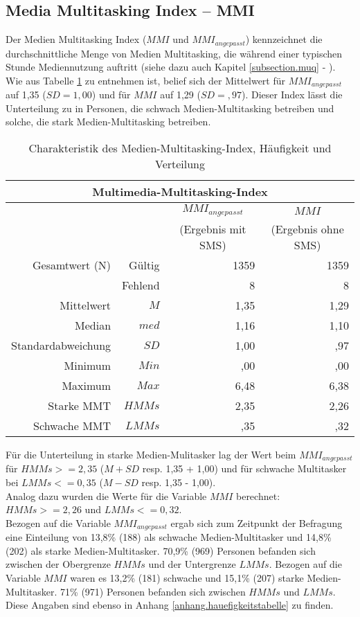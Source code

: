 \subsection{Media Multitasking Index -- MMI}
Der Medien Multitasking Index ($MMI$ und $MMI_{angepasst}$) kennzeichnet die durchschnittliche Menge von Medien Multitasking, die während einer typischen Stunde Mediennutzung auftritt (siehe dazu auch Kapitel \ref{subsection.muq} - ). Wie aus Tabelle \ref{table.deskrptMedien} zu entnehmen ist, belief sich der Mittelwert für $MMI_{angepasst}$ auf 1,35 ($SD =  1,00$) und für $MMI$ auf 1,29 ($SD = ,97$). Dieser Index lässt die Unterteilung zu in Personen, die schwach Medien-Multitasking betreiben und solche, die stark Medien-Multitasking betreiben.\\
\begin{table}[ht] 
    \centering
    \caption{Charakteristik des Medien-Multitasking-Index, Häufigkeit und Verteilung}
    \begin{tabular}[t]{|r r|r|r|} 
        \hline
        \multicolumn{4}{|c|}{\textbf{Multimedia-Multitasking-Index}}\\ 
        \hline       
        \multicolumn{2}{|c}{} & \multicolumn{1}{c|}{$MMI_{angepasst}$} & \multicolumn{1}{|c|}{$MMI$}\\
        \multicolumn{2}{|c}{} & \multicolumn{1}{c|}{(Ergebnis mit SMS)} & \multicolumn{1}{|c|}{(Ergebnis ohne SMS)}\\
        \hline
        Gesamtwert (N) & Gültig & 1359 & 1359\\
        & Fehlend & 8 & 8\\
        Mittelwert & $M$ & 1,35 & 1,29\\
        Median & $med$ & 1,16 & 1,10\\
        Standardabweichung & $SD$ & 1,00 & ,97\\
        Minimum & $Min$ & ,00 & ,00\\
        Maximum & $Max$ & 6,48 & 6,38\\
        Starke MMT & $HMMs$ & 2,35 & 2,26\\
        Schwache MMT & $LMMs$ & ,35 & ,32\\
        \hline
    \end{tabular}
    \label{table.deskrptMedien}
\end{table}
Für die Unterteilung in starke Medien-Mulitasker lag der Wert beim $MMI_{angepasst}$ für $HMMs >= 2,35$ ($M + SD$ resp. 1,35 + 1,00) und für schwache Multitasker bei $LMMs <= 0,35$ ($M - SD$ resp. 1,35 - 1,00). \\
Analog dazu wurden die Werte für die Variable $MMI$ berechnet: $HMMs >= 2,26$ und $LMMs <= 0,32$. \\
Bezogen auf die Variable $MMI_{angepasst}$ ergab sich zum Zeitpunkt der Befragung eine Einteilung von 13,8\% (188) als schwache Medien-Multitasker und 14,8\% (202) als starke Medien-Multitasker. 70,9\% (969) Personen befanden sich zwischen der Obergrenze $HMMs$ und der Untergrenze $LMMs$.
Bezogen auf die Variable $MMI$ waren es 13,2\% (181) schwache und 15,1\% (207) starke Medien-Multitasker. 71\% (971) Personen befanden sich zwischen $HMMs$ und $LMMs$. Diese Angaben sind ebenso in Anhang \ref{anhang.hauefigkeitstabelle} zu finden.

